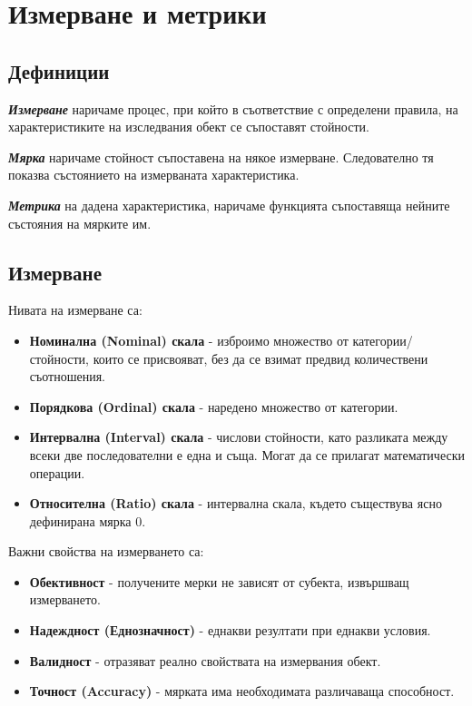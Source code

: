 \documentclass[fleqn,12pt]{article}
\begin{document}
\section{Измерване и метрики}

\subsection{Дефиниции}

\textbf{\textit{Измерване}} наричаме процес, при който в съответствие с определени правила, на характеристиките на изследвания обект се съпоставят стойности.
\bigbreak

\textbf{\textit{Мярка}} наричаме стойност съпоставена на някое измерване.
Следователно тя показва състоянието на измерваната характеристика.
\bigbreak

\textbf{\textit{Метрика}} на дадена характеристика, наричаме функцията съпоставяща нейните състояния на мярките им.

\subsection{Измерване}

Нивата на измерване са:
\begin{itemize}
    \item \textbf{Номинална (Nominal) скала} - изброимо множество от категории/стойности, които се присвояват, без да се взимат предвид количествени съотношения.
    \item \textbf{Порядкова (Ordinal) скала} - наредено множество от категории.
    \item \textbf{Интервална (Interval) скала} - числови стойности, като разликата между всеки две последователни е една и съща.
    Могат да се прилагат математически операции.
    \item \textbf{Относителна (Ratio) скала} - интервална скала, където съществува ясно дефинирана мярка 0.
\end{itemize}

Важни свойства на измерването са:
\begin{itemize}
    \item \textbf{Обективност} - получените мерки не зависят от субекта, извършващ измерването.
    \item \textbf{Надеждност (Еднозначност)} - еднакви резултати при еднакви условия.
    \item \textbf{Валидност} - отразяват реално свойствата на измервания обект.
    \item \textbf{Точност (Accuracy)} - мярката има необходимата различаваща способност.
\end{itemize}
\end{document}
